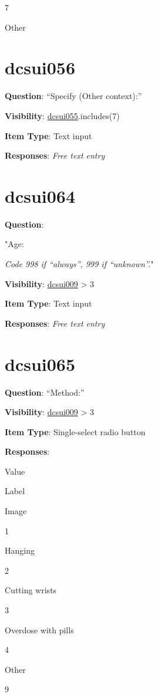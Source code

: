 \documentclass[]{book}
\begin{document}
7

Other

\hypertarget{dcsui056}{%
\section{dcsui056}\label{dcsui056}}

\textbf{Question}: ``Specify (Other context):''

\textbf{Visibility}: \protect\hyperlink{dcsui055}{dcsui055}.includes(7)

\textbf{Item Type}: Text input

\textbf{Responses}: \emph{Free text entry}

\hypertarget{dcsui064}{%
\section{dcsui064}\label{dcsui064}}

\textbf{Question}:

"Age:

\emph{Code 998 if ``always'', 999 if ``unknown''.}"

\textbf{Visibility}: \protect\hyperlink{dcsui009}{dcsui009} \textgreater{} 3

\textbf{Item Type}: Text input

\textbf{Responses}: \emph{Free text entry}

\hypertarget{dcsui065}{%
\section{dcsui065}\label{dcsui065}}

\textbf{Question}: ``Method:''

\textbf{Visibility}: \protect\hyperlink{dcsui009}{dcsui009} \textgreater{} 3

\textbf{Item Type}: Single-select radio button

\textbf{Responses}:

Value

Label

Image

1

Hanging

2

Cutting wrists

3

Overdose with pills

4

Other

9
\end{document}

